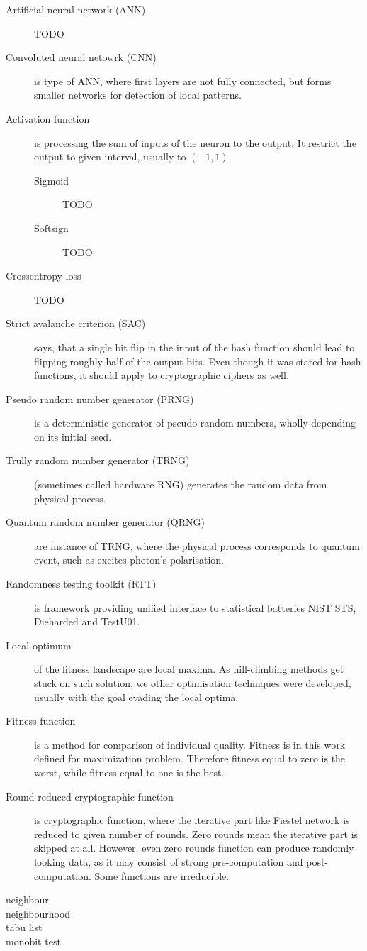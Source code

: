 \documentclass[
  print, %
  Table,   %
  nolof,     %
  nolot,     %
  11pt, %
  oneside  %
]{fithesis3}
\begin{document}
\begin{description}
    \item[Artificial neural network (ANN)] TODO
    \item[Convoluted neural netowrk (CNN)] is type of ANN, where first layers are not fully connected, but forms smaller networks for detection of local patterns.
    \item[Activation function] is processing the sum of inputs of the neuron to the output. It restrict the output to given interval, usually to $(-1, 1)$.
    \begin{description}
        \item[Sigmoid] TODO
        \item[Softsign] TODO
    \end{description}
    \item[Crossentropy loss] TODO

    \item[Strict avalanche criterion (SAC)] says, that a single bit flip in the input of the hash function should lead to flipping roughly half of the output bits. Even though it was stated for hash functions, it should apply to cryptographic ciphers as well.
    \item[Pseudo random number generator (PRNG)] is a deterministic generator of pseudo-random numbers, wholly depending on its initial seed.
    \item[Trully random number generator (TRNG)] (sometimes called hardware RNG) generates the random data from physical process.
    \item[Quantum random number generator (QRNG)] are instance of TRNG, where the physical process corresponds to quantum event, such as excites photon's polarisation.
    \item[Randomness testing toolkit (RTT)] is framework providing unified interface to statistical batteries NIST STS, Dieharded and TestU01.
    \item[Local optimum] of the fitness landscape are local maxima. As hill-climbing methods get stuck on such solution, we other optimisation techniques were developed, usually with the goal evading the local optima.
    \item[Fitness function] is a method for comparison of individual quality. Fitness is in this work defined for maximization problem. Therefore fitness equal to zero is the worst, while fitness equal to one is the best.
    \item[Round reduced cryptographic function] is cryptographic function, where the iterative part like Fiestel network is reduced to given number of rounds. Zero rounds mean the iterative part is skipped at all. However, even zero rounds function can produce randomly looking data, as it may consist of strong pre-computation and post-computation. Some functions are irreducible.
    \item[neighbour]
    \item[neighbourhood]
    \item[tabu list]
    \item[monobit test]
\end{description}
\end{document}
